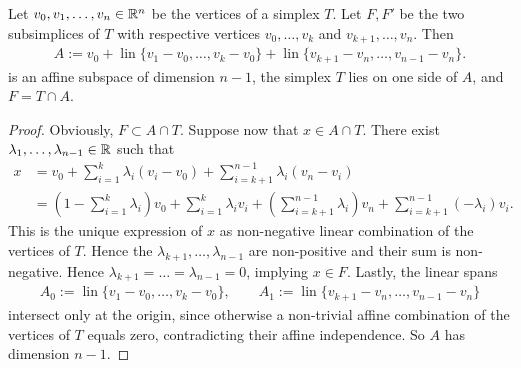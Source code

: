 \documentclass[10pt,a4paper]{article}
\begin{document}
\begin{lemma}\label{lemma:oppositesubsimplex}
    Let $v_0, v_1, \dots, v_n \in {\mathbb R}^n$ be the vertices of a simplex $T$.
    Let $F, F'$ be the two subsimplices of $T$ with respective vertices $v_0,\dots,v_k$ and $v_{k+1},\dots,v_n$.
    Then
    \begin{gather*}
        A 
        := 
        v_0 
        + 
        \operatorname{lin}\{ v_1 - v_0, \dots, v_k - v_0 \} 
        +  
        \operatorname{lin}\{ v_{k+1} - v_n, \dots, v_{n-1} - v_n \}.
    \end{gather*}
	is an affine subspace of dimension $n-1$, the simplex $T$ lies on one side of $A$,
	and $F = T \cap A$.
\end{lemma}
\begin{proof}
    Obviously, $F \subset A \cap T$. 
    Suppose now that $x \in A \cap T$.
    There exist $\lambda_1,\dots,\lambda_{n-1} \in {\mathbb R}$ such that 
    \begin{align*}
        x &= 
        v_0 + \sum_{i=1}^{k} \lambda_{i} ( v_i - v_0 ) + \sum_{i=k+1}^{n-1} \lambda_{i} ( v_n - v_i )
        \\&
        = 
        \left( 1 - \sum_{i=1}^{k} \lambda_{i} \right) v_0 
        + 
        \sum_{i=1  }^{k  } \lambda_{i} v_i 
        + 
        \left( \sum_{i=k+1}^{n-1} \lambda_{i} \right) v_n
        + 
        \sum_{i=k+1}^{n-1} (-\lambda_{i}) v_i 
        .
    \end{align*}
    This is the unique expression of $x$ as non-negative linear combination of the vertices of $T$.
    Hence the $\lambda_{k+1}, \dots, \lambda_{n-1}$ are non-positive and their sum is non-negative.
    Hence $\lambda_{k+1} = \dots = \lambda_{n-1} = 0$, implying $x \in F$.
    Lastly, the linear spans 
    \begin{gather*}
        A_{0} := \operatorname{lin}\{ v_1 - v_0, \dots, v_k - v_0 \},
        \qquad 
        A_{1} := \operatorname{lin}\{ v_{k+1} - v_n, \dots, v_{n-1} - v_n \}
    \end{gather*}
    intersect only at the origin, since otherwise a non-trivial affine combination of the vertices of $T$ equals zero, 
	contradicting their affine independence. %
    So $A$ has dimension $n-1$. 
\end{proof}
\end{document}
